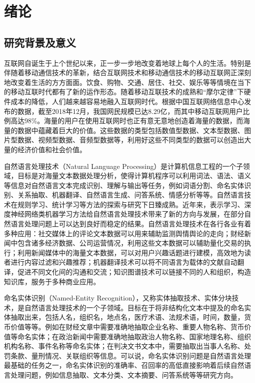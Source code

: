 \documentclass[winfonts,master,oneside,nobackinfo]{njuthesis}
\begin{document}
\chapter{绪论}\label{chapter_introduction}
\section{研究背景及意义}
互联网自诞生于上个世纪以来，正一步一步地改变着地球上每个人的生活。特别是伴随着移动通信技术的革新，结合互联网技术和移动通信技术的移动互联网正深刻地改变着生活的方方面面。饮食、购物、交通、居住、社交、娱乐等等情境在当下的移动互联时代都有了新的运作形态。随着移动互联技术的成熟和“摩尔定律”下硬件成本的降低，人们越来越容易地融入互联网时代。根据中国互联网络信息中心发布的数据，截至2018年12月，我国网民规模已达8.29亿，而其中移动互联网用户比例高达98\%。海量的用户在使用互联网时也正有意无意地创造着海量的数据，而海量的数据中蕴藏着巨大的价值。这些数据的类型包括数值型数据、文本型数据、图片型数据、视频型数据、音频型数据等，利用好这些不同类型的数据可以创造出大量的经济价值和社会价值。

自然语言处理技术（Natural Language Processing）是计算机信息工程的一个子领域，目标是对海量文本数据处理分析，使得计算机程序可以利用词法、语法、语义等信息对自然语言文本完成识别、理解与输出等任务，例如词语分割、命名实体识别、关系抽取、机器翻译、自然语言生成、问答系统、情感分析等等。自然语言技术在规则学习、统计学习等方法的探索与研究下日臻成熟。近年来，表示学习、深度神经网络类机器学习方法给自然语言处理技术带来了新的方向与发展，在部分自然语言处理问题上可以达到良好而稳定的结果。自然语言处理技术在各行各业有着多种应用：社交媒体上的评论文本数据可以用来辅助监测舆情舆论的走向；财经新闻中包含诸多经济数据、公司运营情况，利用这些文本数据可以辅助量化交易的执行；利用新闻媒体中的海量文本数据，可以对用户兴趣话题进行建模，高效地为读者进行内容过滤和兴趣推荐；机器翻译技术可以将不同语言为载体的文献自动翻译，促进不同文化间的沟通和交流；知识图谱技术可以链接不同的人和组织，构造知识库，服务于多种商业应用。

命名实体识别（Named-Entity Recognition），又称实体抽取技术、实体分块技术，是自然语言处理技术的一个子领域。目标在于将非结构化文本中提及的命名实体抽取出来，包括人名，组织名，地点名，医疗术语、法规术语，时间，数量，货币价值等等。例如在财经文章中需要准确地抽取企业名称、重要人物名称、货币价值等命名实体；在政治新闻中需要准确地抽取政治人物名称、国家地理名称、组织机构名称、事件名称等命名实体；在判决文书文本中，需要抽取出当事人名称、处罚条款、量刑情况、关联组织等信息。可以说，命名实体识别问题是自然语言处理最基础的任务之一，命名实体识别的准确率、召回率的高低直接影响着后续自然语言处理问题，例如信息抽取、文本分类、文本摘要、问答系统等等研究方向。
\end{document}
